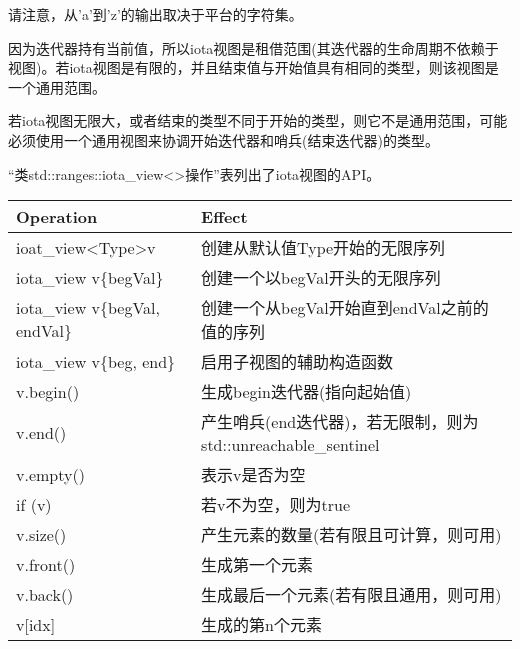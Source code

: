 请注意，从'a'到'z'的输出取决于平台的字符集。


因为迭代器持有当前值，所以iota视图是租借范围(其迭代器的生命周期不依赖于视图)。若iota视图是有限的，并且结束值与开始值具有相同的类型，则该视图是一个通用范围。

若iota视图无限大，或者结束的类型不同于开始的类型，则它不是通用范围，可能必须使用一个通用视图来协调开始迭代器和哨兵(结束迭代器)的类型。


“类std::ranges::iota\_view<>操作”表列出了iota视图的API。


\begin{longtable}[c]{|l|l|}
\hline
\textbf{Operation}       & \textbf{Effect}                                                    \\ \hline
\endfirsthead
%
\endhead
%
ioat\_view\textless{}Type\textgreater v & 创建从默认值Type开始的无限序列               \\ \hline
iota\_view v\{begVal\}   & 创建一个以begVal开头的无限序列                 \\ \hline
iota\_view v\{begVal, endVal\}          & 创建一个从begVal开始直到endVal之前的值的序列               \\ \hline
iota\_view v\{beg, end\} & 启用子视图的辅助构造函数                             \\ \hline
v.begin()                & 生成begin迭代器(指向起始值)         \\ \hline
v.end()                  & 产生哨兵(end迭代器)，若无限制，则为std::unreachable\_sentinel \\ \hline
v.empty()                & 表示v是否为空                                          \\ \hline
if (v)                   & 若v不为空，则为true                                             \\ \hline
v.size()                 & 产生元素的数量(若有限且可计算，则可用) \\ \hline
v.front()                & 生成第一个元素                                           \\ \hline
v.back()                 & 生成最后一个元素(若有限且通用，则可用)           \\ \hline
v{[}idx{]}               & 生成的第n个元素                                            \\ \hline
\end{longtable}

